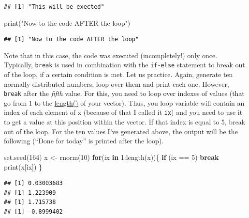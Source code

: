 \documentclass[
]{book}
\newenvironment{Shaded}{\begin{snugshade}}{\end{snugshade}}
\newcommand{\ControlFlowTok}[1]{\textcolor[rgb]{0.13,0.29,0.53}{\textbf{#1}}}
\newcommand{\DecValTok}[1]{\textcolor[rgb]{0.00,0.00,0.81}{#1}}
\newcommand{\FunctionTok}[1]{\textcolor[rgb]{0.00,0.00,0.00}{#1}}
\newcommand{\NormalTok}[1]{#1}
\newcommand{\OtherTok}[1]{\textcolor[rgb]{0.56,0.35,0.01}{#1}}
\newcommand{\SpecialCharTok}[1]{\textcolor[rgb]{0.00,0.00,0.00}{#1}}
\newcommand{\StringTok}[1]{\textcolor[rgb]{0.31,0.60,0.02}{#1}}
\begin{document}
\begin{verbatim}
## [1] "This will be exected"
\end{verbatim}

\begin{Shaded}
\begin{Highlighting}[]
\FunctionTok{print}\NormalTok{(}\StringTok{"Now to the code AFTER the loop"}\NormalTok{)}
\end{Highlighting}
\end{Shaded}

\begin{verbatim}
## [1] "Now to the code AFTER the loop"
\end{verbatim}

Note that in this case, the code was executed (incompletely!) only once. Typically, \texttt{break} is used in combination with the \texttt{if-else} statement to break out of the loop, if a certain condition is met. Let us practice. Again, generate ten normally distributed numbers, loop over them and print each one. However, \texttt{break} after the \emph{fifth} value. For this, you need to loop over indexes of values (that go from 1 to the \href{https://stat.ethz.ch/R-manual/R-devel/library/base/html/length.html}{length()} of your vector). Thus, you loop variable will contain an index of each element of x (because of that I called it \texttt{ix}) and you need to use it to get a value at this position within the vector. If that index is equal to 5, break out of the loop.
For the ten values I've generated above, the output will be the following (``Done for today'' is printed after the loop).

\begin{Shaded}
\begin{Highlighting}[]
\FunctionTok{set.seed}\NormalTok{(}\DecValTok{164}\NormalTok{)}
\NormalTok{x }\OtherTok{\textless{}{-}} \FunctionTok{rnorm}\NormalTok{(}\DecValTok{10}\NormalTok{)}
\ControlFlowTok{for}\NormalTok{(ix }\ControlFlowTok{in} \DecValTok{1}\SpecialCharTok{:}\FunctionTok{length}\NormalTok{(x))\{}
  \ControlFlowTok{if}\NormalTok{ (ix }\SpecialCharTok{==} \DecValTok{5}\NormalTok{)  }\ControlFlowTok{break}
  \FunctionTok{print}\NormalTok{(x[ix])}
\NormalTok{\}}
\end{Highlighting}
\end{Shaded}

\begin{verbatim}
## [1] 0.03003683
## [1] 1.223909
## [1] 1.715738
## [1] -0.8999402
\end{verbatim}
\end{document}
